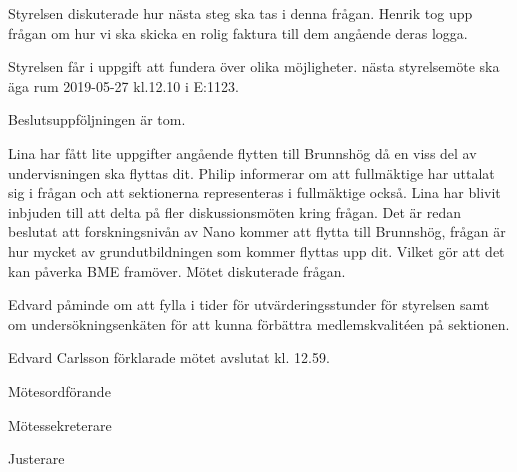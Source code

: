 \documentclass[10pt]{article}
\def\mo{Edvard Carlsson}
\def\ms{Sonja Kenari}
\def\ji{Saga Åslund}
\begin{document}
\begin{paragrafer}
Styrelsen diskuterade hur nästa steg ska tas i denna frågan.
Henrik tog upp frågan om hur vi ska skicka en rolig faktura till dem angående deras logga. 

Styrelsen får i uppgift att fundera över olika möjligheter.
\Mba nästa styrelsemöte ska äga rum 2019-05-27 kl.12.10 i E:1123.

Beslutsuppföljningen är tom.

Lina har fått lite uppgifter angående flytten till Brunnshög då en viss del av undervisningen ska flyttas dit. Philip informerar om att fullmäktige har uttalat sig i frågan och att sektionerna representeras i fullmäktige också. Lina har blivit inbjuden till att delta på fler diskussionsmöten kring frågan. Det är redan beslutat att forskningsnivån av Nano kommer att flytta till Brunnshög, frågan är hur mycket av grundutbildningen som kommer flyttas upp dit. Vilket gör att det kan påverka BME framöver. Mötet diskuterade frågan.

Edvard påminde om att fylla i tider för utvärderingsstunder för styrelsen samt om undersökningsenkäten för att kunna förbättra medlemskvalitéen på sektionen.

{\mo} förklarade mötet avslutat kl. 12.59.
\end{paragrafer}

\hidesignfoot
\begin{signatures}{3}
\signature{\mo}{Mötesordförande}
\signature{\ms}{Mötessekreterare}
\signature{\ji}{Justerare}
\end{signatures}
\end{document}
